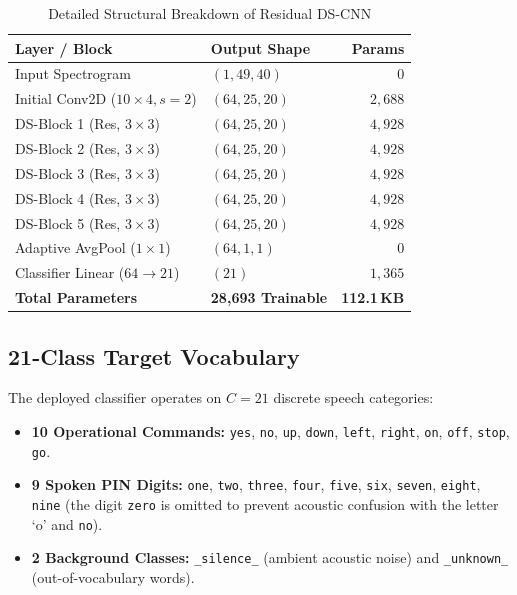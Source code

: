 \documentclass[10pt,twocolumn,letterpaper]{article}
\begin{document}
\begin{table}[htbp]
\centering
\footnotesize
\setlength{\tabcolsep}{3pt}
\caption{Detailed Structural Breakdown of Residual DS-CNN}
\label{tab:model_architecture}
\begin{tabularx}{\columnwidth}{lXr}
\toprule
\textbf{Layer / Block} & \textbf{Output Shape} & \textbf{Params} \\
\midrule
Input Spectrogram & $(1, 49, 40)$ & 0 \\
Initial Conv2D ($10 \times 4, s=2$) & $(64, 25, 20)$ & $2{,}688$ \\
DS-Block 1 (Res, $3 \times 3$) & $(64, 25, 20)$ & $4{,}928$ \\
DS-Block 2 (Res, $3 \times 3$) & $(64, 25, 20)$ & $4{,}928$ \\
DS-Block 3 (Res, $3 \times 3$) & $(64, 25, 20)$ & $4{,}928$ \\
DS-Block 4 (Res, $3 \times 3$) & $(64, 25, 20)$ & $4{,}928$ \\
DS-Block 5 (Res, $3 \times 3$) & $(64, 25, 20)$ & $4{,}928$ \\
Adaptive AvgPool ($1 \times 1$) & $(64, 1, 1)$ & 0 \\
Classifier Linear ($64 \rightarrow 21$) & $(21)$ & $1{,}365$ \\
\midrule
\textbf{Total Parameters} & \textbf{28,693 Trainable} & \textbf{112.1\,KB} \\
\bottomrule
\end{tabularx}
\end{table}

\subsection{21-Class Target Vocabulary}

The deployed classifier operates on $C = 21$ discrete speech categories:
\begin{itemize}
    \item \textbf{10 Operational Commands:} \texttt{yes}, \texttt{no}, \texttt{up}, \texttt{down}, \texttt{left}, \texttt{right}, \texttt{on}, \texttt{off}, \texttt{stop}, \texttt{go}.
    \item \textbf{9 Spoken PIN Digits:} \texttt{one}, \texttt{two}, \texttt{three}, \texttt{four}, \texttt{five}, \texttt{six}, \texttt{seven}, \texttt{eight}, \texttt{nine} (the digit \texttt{zero} is omitted to prevent acoustic confusion with the letter `o' and \texttt{no}).
    \item \textbf{2 Background Classes:} \texttt{\_silence\_} (ambient acoustic noise) and \texttt{\_unknown\_} (out-of-vocabulary words).
\end{itemize}
\end{document}
